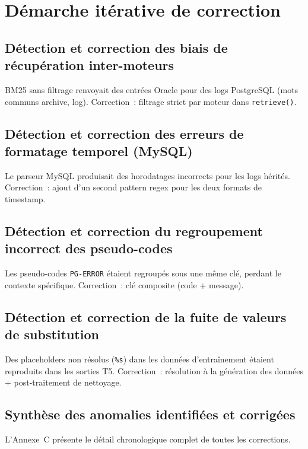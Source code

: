 \documentclass[12pt,a4paper]{report}
\begin{document}
\section{D\'emarche it\'erative de correction}

\subsection{D\'etection et correction des biais de r\'ecup\'eration inter-moteurs}

BM25 sans filtrage renvoyait des entr\'ees Oracle pour des logs PostgreSQL
(mots communs \og{}archive\fg{}, \og{}log\fg{}). Correction~: filtrage strict
par moteur dans \texttt{retrieve()}.

\subsection{D\'etection et correction des erreurs de formatage temporel (MySQL)}

Le parseur MySQL produisait des horodatages incorrects pour les logs h\'erit\'es.
Correction~: ajout d'un second pattern regex pour les deux formats de timestamp.

\subsection{D\'etection et correction du regroupement incorrect des pseudo-codes}

Les pseudo-codes \texttt{PG-ERROR} \'etaient regroup\'es sous une m\^eme cl\'e,
perdant le contexte sp\'ecifique. Correction~: cl\'e composite (code + message).

\subsection{D\'etection et correction de la fuite de valeurs de substitution}

Des placeholders non r\'esolus (\texttt{\%s}) dans les donn\'ees d'entra\^inement
\'etaient reproduits dans les sorties T5. Correction~: r\'esolution \`a la
g\'en\'eration des donn\'ees + post-traitement de nettoyage.

\subsection{Synth\`ese des anomalies identifi\'ees et corrig\'ees}

L'Annexe~C pr\'esente le d\'etail chronologique complet de toutes les corrections.
\end{document}
